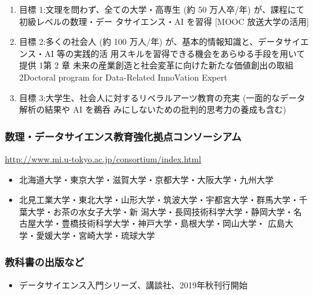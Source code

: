 \documentclass[
]{book}
\providecommand{\tightlist}{%
  \setlength{\itemsep}{0pt}\setlength{\parskip}{0pt}}
\theoremstyle{definition}
\theoremstyle{definition}
\theoremstyle{definition}
\theoremstyle{definition}
\theoremstyle{remark}
\begin{document}
\begin{enumerate}
\def\labelenumi{\arabic{enumi}.}
\tightlist
\item
  目標 1:文理を問わず、全ての大学・高専生 (約 50 万人卒/年) が、課程にて初級レベルの数理・デー タサイエンス・AI を習得 {[}MOOC 放送大学の活用{]}
\item
  目標 2:多くの社会人 (約 100 万人/年) が、基本的情報知識と、データサイエンス・AI 等の実践的活 用スキルを習得できる機会をあらゆる手段を用いて提供
  1第 2 章 未来の産業創造と社会変革に向けた新たな価値創出の取組 2Doctoral program for Data-Related InnoVation Expert
\item
  目標 3:大学生、社会人に対するリベラルアーツ教育の充実 (一面的なデータ解析の結果や AI を鵜呑 みにしないための批判的思考力の養成も含む)
\end{enumerate}

\hypertarget{ux6570ux7406ux30c7ux30fcux30bfux30b5ux30a4ux30a8ux30f3ux30b9ux6559ux80b2ux5f37ux5316ux62e0ux70b9ux30b3ux30f3ux30bdux30fcux30b7ux30a2ux30e0}{%
\subsubsection{数理・データサイエンス教育強化拠点コンソーシアム}\label{ux6570ux7406ux30c7ux30fcux30bfux30b5ux30a4ux30a8ux30f3ux30b9ux6559ux80b2ux5f37ux5316ux62e0ux70b9ux30b3ux30f3ux30bdux30fcux30b7ux30a2ux30e0}}

\url{http://www.mi.u-tokyo.ac.jp/consortium/index.html}

\begin{itemize}
\tightlist
\item
  北海道大学・東京大学・滋賀大学・京都大学・大阪大学・九州大学
\item
  北見工業大学・東北大学・山形大学・筑波大学・宇都宮大学・群馬大学・千葉大学・お茶の水女子大学・新 潟大学・長岡技術科学大学・静岡大学・名古屋大学・豊橋技術科学大学・神戸大学・島根大学・岡山大学・ 広島大学・愛媛大学・宮崎大学・琉球大学
\end{itemize}

\hypertarget{ux6559ux79d1ux66f8ux306eux51faux7248ux306aux3069}{%
\subsubsection{教科書の出版など}\label{ux6559ux79d1ux66f8ux306eux51faux7248ux306aux3069}}

\begin{itemize}
\tightlist
\item
  データサイエンス入門シリーズ、講談社、2019年秋刊行開始
\end{itemize}
\end{document}

